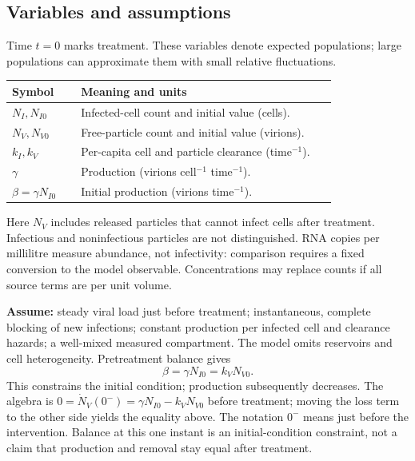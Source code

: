 \subsection{Variables and assumptions}\label{subsec:hiv-variables}
Time $t=0$ marks treatment. These variables denote expected populations; large populations can approximate them with small relative fluctuations.
\begin{center}
\begin{tabular}{@{}p{0.20\linewidth}p{0.74\linewidth}@{}}
\toprule
Symbol & Meaning and units\\
\midrule
$N_I,N_{I0}$ & Infected-cell count and initial value (cells).\\
$N_V,N_{V0}$ & Free-particle count and initial value (virions).\\
$k_I,k_V$ & Per-capita cell and particle clearance (time$^{-1}$).\\
$\gamma$ & Production (virions cell$^{-1}$ time$^{-1}$).\\
$\beta=\gamma N_{I0}$ & Initial production (virions time$^{-1}$).\\
\bottomrule
\end{tabular}
\end{center}
Here $N_V$ includes released particles that cannot infect cells after treatment. Infectious and noninfectious particles are not distinguished. RNA copies per millilitre measure abundance, not infectivity: comparison requires a fixed conversion to the model observable. Concentrations may replace counts if all source terms are per unit volume.

\textbf{Assume:} steady viral load just before treatment; instantaneous, complete blocking of new infections; constant production per infected cell and clearance hazards; a well-mixed measured compartment. The model omits reservoirs and cell heterogeneity. Pretreatment balance gives
\begin{equation}\label{eq:hiv-presteady}
\boxed{\beta=\gamma N_{I0}=k_VN_{V0}.}
\end{equation}
This constrains the initial condition; production subsequently decreases.
The algebra is $0=\dot N_V(0^-)=\gamma N_{I0}-k_VN_{V0}$ before treatment; moving the loss term to the other side yields the equality above. The notation $0^-$ means just before the intervention. Balance at this one instant is an initial-condition constraint, not a claim that production and removal stay equal after treatment.

